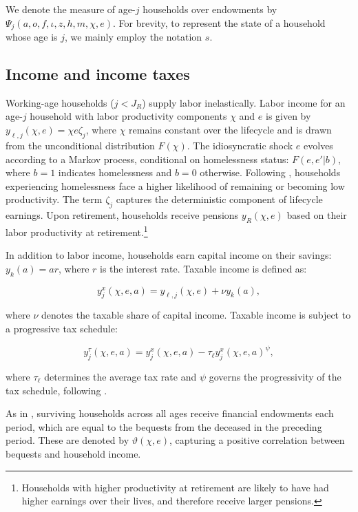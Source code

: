 \documentclass[parskip=full]{article}
\begin{document}
\noindent We denote the measure of age-$j$ households over endowments by $\Psi_{j}(a,o,f,\iota,z,h,m,\chi,e)$. For brevity, to represent the state of a household whose age is $j$, we mainly employ the notation $s$.

\subsection{Income and income taxes}\label{subsection:income}

Working-age households ($j<J_{R}$) supply labor inelastically. Labor income for an age-$j$ household with labor productivity components $\chi$ and $e$ is given by $y_{\ell,j}(\chi,e)=\chi e\zeta_j$, where $\chi$ remains constant over the lifecycle and is drawn from the unconditional distribution $\hat{F}(\chi)$. The idiosyncratic shock $e$ evolves according to a Markov process, conditional on homelessness status: $F(e,e'|b)$, where $b=1$ indicates homelessness and $b=0$ otherwise. Following \citet{az-2024}, households experiencing homelessness face a higher likelihood of remaining or becoming low productivity. The term $\zeta_j$ captures the deterministic component of lifecycle earnings. Upon retirement, households receive pensions $y_{R}(\chi,e)$ based on their labor productivity at retirement.\footnote{Households with higher productivity at retirement are likely to have had higher earnings over their lives, and therefore receive larger pensions.}

In addition to labor income, households earn capital income on their savings: $y_{k}(a)=ar$, where $r$ is the interest rate. Taxable income is defined as:

\begin{equation*}\label{eq:taxable_labor_income}
  y^{x}_{j}(\chi,e,a) =y_{\ell,j}(\chi,e)+\nu y_{k}(a),
\end{equation*}

\noindent where $\nu$ denotes the taxable share of capital income. Taxable income is subject to a progressive tax schedule:

\begin{equation}\label{eq:income_tax}
  y^{\tau}_{j}(\chi,e,a) = y^{x}_{j}(\chi,e,a)-\tau_{\ell}y^{x}_{j}(\chi,e,a)^{\psi},
\end{equation}

\noindent where $\tau_{\ell}$ determines the average tax rate and $\psi$ governs the progressivity of the tax schedule, following \citep{hsv-2020}.

As in \citet{kkk-2021}, surviving households across all ages receive financial endowments each period, which are equal to the bequests from the deceased in the preceding period. These are denoted by $\vartheta (\chi,e)$, capturing a positive correlation between bequests and household income.
\end{document}
